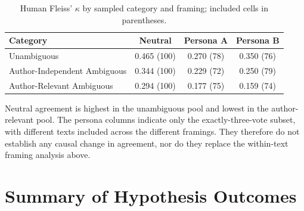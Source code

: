 \begin{table}[h]
\centering
\footnotesize
\caption{Human Fleiss' $\kappa$ by sampled category and framing; included cells in parentheses.}
\label{tab:fleiss}
\begin{tabular}{lccc}
\hline
\textbf{Category} & \textbf{Neutral} & \textbf{Persona A} & \textbf{Persona B} \\
\hline
Unambiguous & 0.465 (100) & 0.270 (78) & 0.350 (76) \\
Author-Independent Ambiguous & 0.344 (100) & 0.229 (72) & 0.250 (79) \\
Author-Relevant Ambiguous & 0.294 (100) & 0.177 (75) & 0.159 (74) \\
\hline
\end{tabular}
\end{table}

\noindent
Neutral agreement is highest in the unambiguous pool and lowest in the author-relevant pool. The
persona columns indicate only the exactly-three-vote subset, with different texts included across
the different framings. They therefore do not establish any causal change in agreement, nor do they
replace the within-text framing analysis above.

\section{Summary of Hypothesis Outcomes}
\label{res:summary}

